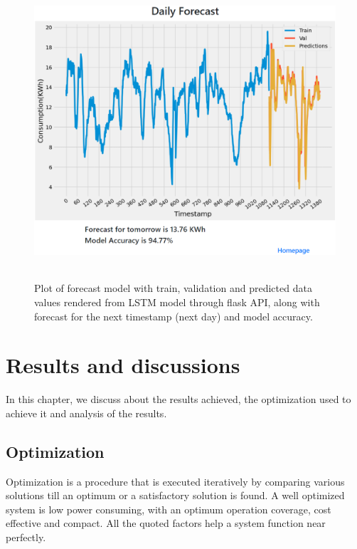 \documentclass[12 pt]{report}
\begin{document}
\begin{figure}[h!]
 \centering
 \includegraphics[width=17cm,height = 11cm,frame]{images/results.png}
 \caption{Plot of forecast model with train, validation and predicted data values rendered from LSTM model through flask API, along with forecast for the next timestamp (next day) and model accuracy.}
 \label{fig:Forecast Results}
\end{figure}


\newpage

\chapter{Results and discussions}

In this chapter, we discuss about the results achieved, the optimization used to achieve it and analysis of the results.

\section{Optimization}
Optimization is a procedure that is executed iteratively by comparing various solutions till an optimum or a satisfactory solution is found.
\newline
A well optimized system is low power consuming, with an optimum operation coverage, cost effective and compact. All the quoted factors help a system function near perfectly.
\end{document}
